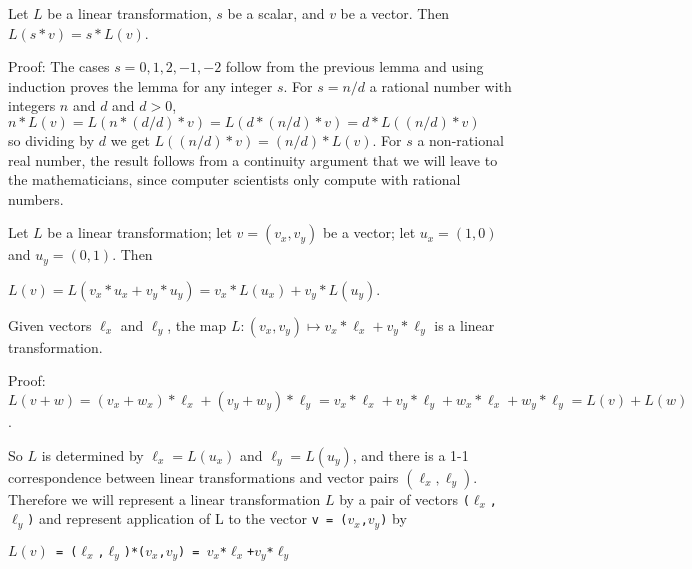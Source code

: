 \documentclass[12pt]{article}
\begin{document}
\begin{lemma}
Let $L$ be a linear transformation, $s$ be a scalar, and $v$ be a vector.
Then $L(s*v)=s*L(v)$.
\end{lemma}
\begin{indpar}{0.5in}
Proof: The cases $s=0,1,2,-1,-2$ follow from the previous lemma and
using induction proves the lemma for any integer $s$.  For $s=n/d$
a rational number with integers $n$ and $d$ and $d>0$, \\
\hspace*{0.1in}$n*L(v) = L(n*(d/d)*v) = L(d*(n/d)*v)=d*L((n/d)*v)$ \\
so dividing by $d$
we get $L((n/d)*v)=(n/d)*L(v)$.  For $s$ a non-rational real number,
the result follows from a continuity argument that we will leave
to the mathematicians, since computer scientists only compute
with rational numbers.
\end{indpar}

Let $L$ be a linear transformation; let $v=(v_x,v_y)$ be a vector;
let $u_x=(1,0)$ and $u_y =(0,1)$.  Then \\
\centerline{$L(v) = L(v_x*u_x+v_y*u_y)=v_x*L(u_x)+v_y*L(u_y)$.}

\begin{lemma}
Given vectors $\ell_x$ and $\ell_y$, the map
$L:(v_x,v_y)\longmapsto v_x*\ell_x+v_y*\ell_y$ is a linear
transformation.
\end{lemma}
\begin{indpar}{0.5in}
Proof: $L(v+w) = (v_x+w_x)*\ell_x+(v_y+w_y)*\ell_y
               = v_x*\ell_x+v_y*\ell_y+w_x*\ell_x+w_y*\ell_y
	       = L(v) + L(w)$.
\end{indpar}

So $L$ is determined by $\ell_x = L(u_x)$ and $\ell_y = L(u_y)$,
and there is a 1-1 correspondence between linear transformations
and vector pairs $(\ell_x,\ell_y)$.  Therefore we will represent a linear
transformation $L$ by a pair of vectors {\tt ($\ell_x$,$\ell_y$)}
and represent application of L to the vector {\tt v = ($v_x$,$v_y$)} by \\
\centerline{\tt $L(v)$ = ($\ell_x$,$\ell_y$)*($v_x$,$v_y$) =
             $v_x$*$\ell_x$+$v_y$*$\ell_y$}
\end{document}
